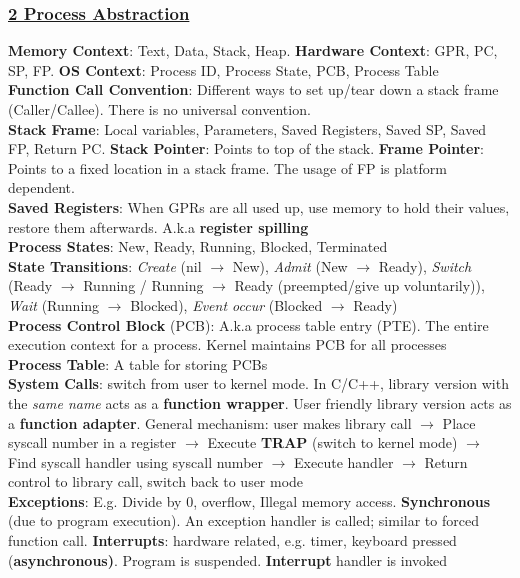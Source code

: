 \documentclass{article}
\begin{document}
\begin{multicols*}{3}
\subsubsection*{\underline{2 Process Abstraction}}
\textbf{Memory Context}: Text, Data, Stack, Heap. \textbf{Hardware Context}: GPR, PC, SP, FP. \textbf{OS Context}: Process ID, Process State, PCB, Process Table  \\
\textbf{Function Call Convention}: Different ways to set up/tear down a stack frame (Caller/Callee). There is no universal convention. \\
\textbf{Stack Frame}: Local variables, Parameters, Saved Registers, Saved SP, Saved FP, Return PC. \textbf{Stack Pointer}: Points to top of the stack. \textbf{Frame Pointer}: Points to a fixed location in a stack frame. The usage of FP is platform dependent. \\
\textbf{Saved Registers}: When GPRs are all used up, use memory to hold their values, restore them afterwards. A.k.a \textbf{register spilling} \\
\textbf{Process States}: New, Ready, Running, Blocked, Terminated \\
\textbf{State Transitions}: \textit{Create} (nil $\to$ New), \textit{Admit} (New $\to$ Ready), \textit{Switch} (Ready $\to$ Running / Running $\to$ Ready (preempted/give up voluntarily)), \textit{Wait} (Running $\to$ Blocked), \textit{Event occur} (Blocked $\to$ Ready) \\
\textbf{Process Control Block} (PCB): A.k.a process table entry (PTE). The entire execution context for a process. Kernel maintains PCB for all processes \\
\textbf{Process Table}: A table for storing PCBs \\
\textbf{System Calls}: switch from user to kernel mode. In C/C++, library version with the \textit{same name} acts as a \textbf{function wrapper}. User friendly library version acts as a \textbf{function adapter}. General mechanism: user makes library call $\to$ Place syscall number in a register $\to$ Execute \textbf{TRAP} (switch to kernel mode) $\to$ Find syscall handler using syscall number $\to$ Execute handler $\to$ Return control to library call, switch back to user mode \\
\textbf{Exceptions}: E.g. Divide by 0, overflow, Illegal memory access. \textbf{Synchronous} (due to program execution). An exception handler is called; similar to forced function call. \textbf{Interrupts}: hardware related, e.g. timer, keyboard pressed (\textbf{asynchronous)}. Program is suspended. \textbf{Interrupt} handler is invoked \\

\end{multicols*}
\end{document}
